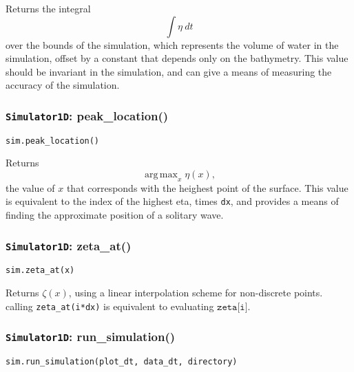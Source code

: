 \documentclass[10pt,a4paper]{article}
\DeclareMathOperator*{\argmax}{arg\,max}
\begin{document}
Returns the integral
$$\int \eta~dt$$
over the bounds of the simulation, which represents the volume of water in the simulation, offset by a constant that depends only on the bathymetry. This value should be invariant in the simulation, and can give a means of measuring the accuracy of the simulation.




\subsubsection{\texttt{Simulator1D}: peak\_location()}
\texttt{sim.peak\_location()}

Returns $$\argmax_{x} \eta(x),$$ the value of $x$ that corresponds with the heighest point of the surface. This value is equivalent to the index of the highest eta, times \texttt{dx}, and provides a means of finding the approximate position of a solitary wave.



\subsubsection{\texttt{Simulator1D}: zeta\_at()}
\texttt{sim.zeta\_at(x)}

Returns $\zeta(x)$, using a linear interpolation scheme for non-discrete points. calling \texttt{zeta\_at(i*dx)} is equivalent to evaluating $\texttt{zeta[i]}$.




\subsubsection{\texttt{Simulator1D}: run\_simulation()}
\texttt{sim.run\_simulation(plot\_dt, data\_dt, directory)}
\end{document}
